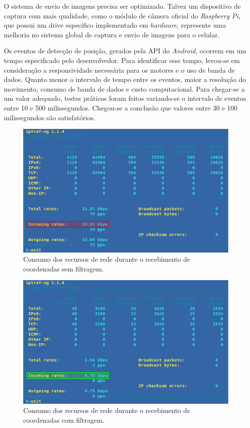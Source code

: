 O sistema de envio de imagens precisa ser optimizado. Talvez um dispositivo de captura com mais qualidade, como o módulo de câmera oficial do \textit{Raspberry Pi}, que possui um drive especifico implementado em \textit{hardware}, represente uma melhoria no sistema global de captura e envio de imagens para o celular.\par

Os eventos de detecção de posição, gerados pela API do \textit{Android}, ocorrem em um tempo especificado pelo desenvolvedor. Para identificar esse tempo, levou-se em consideração a responsividade necessária para os motores e o uso de banda de dados. Quanto menor o intervalo de tempo entre os eventos, maior a resolução do movimento,  consumo de banda de dados e custo computacional. Para chegar-se a um valor adequado, testes práticos foram feitos variando-se o intervalo de eventos entre 10 e 500 milissegundos. Chegou-se a conclusão que valores entre 30 e 100 milissegundos são satisfatórios.\par

\begin{figure}[H]
	\centering
	\includegraphics[width=1\textwidth]{figuras/consumo_banda_unfiltered.png}
	\caption{Consumo dos recursos de rede durante o recebimento de coordenadas sem filtragem.}
	\label{fig:consumo_banda_coord_unfiltered}
\end{figure}

\begin{figure}[H]
	\centering
	\includegraphics[width=1\textwidth]{figuras/consumo_banda_filtered.png}
	\caption{Consumo dos recursos de rede durante o recebimento de coordenadas com filtragem.}
	\label{fig:consumo_banda_coord_filtered}
\end{figure}

